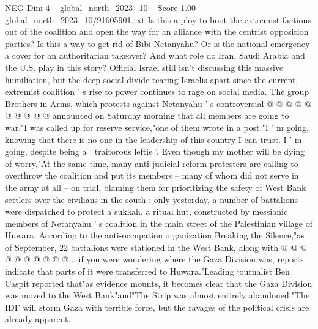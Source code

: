 \begin{textsample}{NEG Dim 4 – global\_north\_2023\_10 – Score 1.00 – global\_north\_2023\_10/91605901.txt}
Is this a ploy to boot the extremist factions out of the coalition and open the way for an alliance with the centrist opposition parties?
Is this a way to get rid of Bibi Netanyahu?
Or is the national emergency a cover for an authoritarian takeover?
And what role do Iran, Saudi Arabia and the U.S. play in this story?
Official Israel still isn't discussing this massive humiliation, but the deep social divide tearing Israelis apart since the current, extremist coalition ' s rise to power continues to rage on social media.
The group Brothers in Arms, which protests against Netanyahu ' s controversial @ @ @ @ @ @ @ @ @ @ announced on Saturday morning that all members are going to war."I was called up for reserve service,"one of them wrote in a post."I ' m going, knowing that there is no one in the leadership of this country I can trust.
I ' m going, despite being a ' traitorous leftie '.
Even though my mother will be dying of worry."At the same time, many anti-judicial reform protesters are calling to overthrow the coalition and put its members -- many of whom did not serve in the army at all -- on trial, blaming them for prioritizing the safety of West Bank settlers over the civilians in the south : only yesterday, a number of battalions were dispatched to protect a sukkah, a ritual hut, constructed by messianic members of Netanyahu ' s coalition in the main street of the Palestinian village of Huwara.
According to the anti-occupation organization Breaking the Silence,"as of September, 22 battalions were stationed in the West Bank, along with @ @ @ @ @ @ @ @ @ @... if you were wondering where the Gaza Division was, reports indicate that parts of it were transferred to Huwara."Leading journalist Ben Caspit reported that"as evidence mounts, it becomes clear that the Gaza Division was moved to the West Bank"and"The Strip was almost entirely abandoned."The IDF will storm Gaza with terrible force, but the ravages of the political crisis are already apparent.

\end{textsample}
